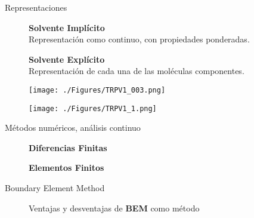 \documentclass[serif,usenames,dvipsnames,landscape]{beamer}
\begin{document}
\begin{frame}{Representaciones}
	\begin{figure}
		\begin{minipage}{0.34\slidewidth}
			{\Large \textbf{Solvente Implícito}}\\[0.5cm]
			Representación como continuo, con propiedades ponderadas.
		\end{minipage}%
		\begin{minipage}{0.1\slidewidth}
			\hspace*{0.5cm}
		\end{minipage}%
		\begin{minipage}{0.33\slidewidth}
			{\Large \textbf{Solvente Explícito}}\\[0.5cm]
			Representación de cada una de las moléculas componentes.
		\end{minipage}\vspace{0.5cm}
		\begin{minipage}{0.4\slidewidth}
			\hspace*{5pt}
			\texttt{[image: ./Figures/TRPV1\_003.png]}
		\end{minipage}%
		\begin{minipage}{0.4\slidewidth}
			\hspace*{10pt}
			\texttt{[image: ./Figures/TRPV1\_1.png]}
		\end{minipage}
	\end{figure}
\end{frame}

\begin{frame}{Métodos numéricos, análisis continuo}
	\begin{figure}
		\begin{minipage}{0.4\slidewidth}
				{\Large\textbf{Diferencias Finitas}}\\[0.5cm]
		\end{minipage}%
		\begin{minipage}{0.4\slidewidth}
			{\Large \textbf{Elementos Finitos}}\\[0.5cm]
		\end{minipage}
	\end{figure}
\end{frame}

\begin{frame}{Boundary Element Method}
	\begin{figure}
		\begin{minipage}{0.8\slidewidth}
			\Large{Ventajas y desventajas de \textbf{BEM} como método}
		\end{minipage}
		\vspace{-1cm}
		\begin{minipage}{0.4\slidewidth}
			
		\end{minipage}
	\end{figure}
\end{frame}
\end{document}
